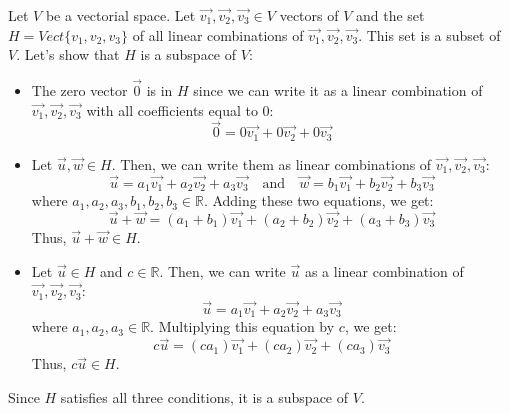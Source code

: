 \begin{eg}
    Let $V$ be a vectorial space. Let $\vec{v_1}, \vec{v_2}, \vec{v_3} \in V$ vectors of $V$ and the set $H = Vect\{v_1,v_2,v_3\}$ of all linear combinations of $\vec{v_1}, \vec{v_2}, \vec{v_3}$. This set is a subset of $V$. Let's show that $H$ is a subspace of $V$:
    \begin{itemize}[itemsep=1pt,label=$\circ$]
        \item The zero vector $\vec{0}$ is in $H$ since we can write it as a linear combination of $\vec{v_1}, \vec{v_2}, \vec{v_3}$ with all coefficients equal to $0$:
        \[ \vec{0} = 0\vec{v_1} + 0\vec{v_2} + 0\vec{v_3} \]
        \item Let $\vec{u}, \vec{w} \in H$. Then, we can write them as linear combinations of $\vec{v_1}, \vec{v_2}, \vec{v_3}$:
        \[ \vec{u} = a_1\vec{v_1} + a_2\vec{v_2} + a_3\vec{v_3} \quad \text{and} \quad \vec{w} = b_1\vec{v_1} + b_2\vec{v_2} + b_3\vec{v_3} \]
        where $a_1, a_2, a_3, b_1, b_2, b_3 \in \mathbb{R}$. Adding these two equations, we get:
        \[ \vec{u} + \vec{w} = (a_1 + b_1)\vec{v_1} + (a_2 + b_2)\vec{v_2} + (a_3 + b_3)\vec{v_3} \]
        Thus, $\vec{u} + \vec{w} \in H$.
        \item Let $\vec{u} \in H$ and $c \in \mathbb{R}$. Then, we can write $\vec{u}$ as a linear combination of $\vec{v_1}, \vec{v_2}, \vec{v_3}$:
        \[ \vec{u} = a_1\vec{v_1} + a_2\vec{v_2} + a_3\vec{v_3} \]
        where $a_1, a_2, a_3 \in \mathbb{R}$. Multiplying this equation by $c$, we get:
        \[ c\vec{u} = (ca_1)\vec{v_1} + (ca_2)\vec{v_2} + (ca_3)\vec{v_3} \]
        Thus, $c\vec{u} \in H$.
    \end{itemize}
    Since $H$ satisfies all three conditions, it is a subspace of $V$.
\end{eg}